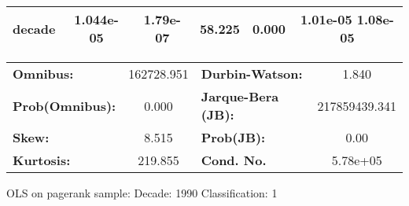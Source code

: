 \begin{center}
\begin{tabular}{lccccc}
\textbf{decade}             &    1.044e-05  &     1.79e-07     &    58.225  &         0.000        &      1.01e-05  1.08e-05       \\
\bottomrule
\end{tabular}
\begin{tabular}{lclc}
\textbf{Omnibus:}       & 162728.951 & \textbf{  Durbin-Watson:     } &       1.840    \\
\textbf{Prob(Omnibus):} &    0.000   & \textbf{  Jarque-Bera (JB):  } & 217859439.341  \\
\textbf{Skew:}          &    8.515   & \textbf{  Prob(JB):          } &        0.00    \\
\textbf{Kurtosis:}      &  219.855   & \textbf{  Cond. No.          } &    5.78e+05    \\
\bottomrule
\end{tabular}
\end{center}
\break
OLS on pagerank sample: Decade: 1990 Classification: 1
